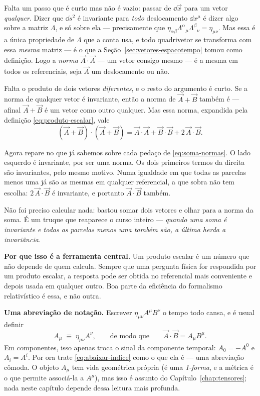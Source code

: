 \documentclass[12pt,a4paper,oneside]{book}
\theoremstyle{rgplain}
\theoremstyle{rgremark}
\begin{document}
Falta um passo que é curto mas não é vazio: passar de $\dd\vec x$ para um vetor
\emph{qualquer}. Dizer que $\dd s^2$ é invariante para \emph{todo} deslocamento
$\dd x^\mu$ é dizer algo sobre a matriz $\Lambda$, e só sobre ela ---
precisamente que $\eta_{\alpha\beta}\Lambda^\alpha{}_\mu\Lambda^\beta{}_\nu
=\eta_{\mu\nu}$. Mas essa é a única propriedade de $\Lambda$ que a conta usa, e
todo quadrivetor se transforma com essa \emph{mesma} matriz --- é o que a
Seção~\ref{sec:vetores-espacotempo} tomou como definição. Logo a \emph{norma}
$\vec A\cdot\vec A$ --- um vetor consigo mesmo --- é a mesma em todos os
referenciais, seja $\vec A$ um deslocamento ou não.

Falta o produto de dois vetores \emph{diferentes}, e o resto do argumento é
curto. Se a norma de qualquer vetor é invariante, então a norma de
$\vec A+\vec B$ também é --- afinal $\vec A+\vec B$ é um vetor como outro
qualquer. Mas essa norma, expandida pela definição \eqref{eq:produto-escalar},
vale
\begin{equation}
  (\vec A+\vec B)\cdot(\vec A+\vec B)
   =\vec A\cdot\vec A+\vec B\cdot\vec B+2\,\vec A\cdot\vec B .
  \label{eq:soma-normas}
\end{equation}

Agora repare no que já sabemos sobre cada pedaço de \eqref{eq:soma-normas}. O
lado esquerdo é invariante, por ser uma norma. Os dois primeiros termos da
direita são invariantes, pelo mesmo motivo. Numa igualdade em que todas as
parcelas menos uma já são as mesmas em qualquer referencial, a que sobra não
tem escolha: $2\,\vec A\cdot\vec B$ é invariante, e portanto
$\vec A\cdot\vec B$ também.

\begin{roteiro}[title={\sffamily\bfseries\footnotesize\color{rgGrafite}A MANOBRA, EM UMA FRASE}]
Não foi preciso calcular nada: bastou somar dois vetores e olhar para a norma
da soma. É um truque que reaparece o curso inteiro
--- \emph{quando uma soma é invariante e todas as parcelas menos uma também
são, a última herda a invariância}.
\end{roteiro}

\textbf{Por que isso é a ferramenta central.} Um produto escalar é um número
que não depende de quem calcula. Sempre que uma pergunta física for
respondida por um produto escalar, a resposta pode ser obtida no referencial
mais conveniente e depois usada em qualquer outro. Boa parte da eficiência do
formalismo relativístico é essa, e não outra.

\textbf{Uma abreviação de notação.} Escrever $\eta_{\mu\nu}A^\mu B^\nu$ o
tempo todo cansa, e é usual definir
\begin{equation}
  A_\mu\;\equiv\;\eta_{\mu\nu}A^\nu ,
  \qquad\text{de modo que}\qquad
  \vec A\cdot\vec B=A_\mu B^\mu .
  \label{eq:abaixar-indice}
\end{equation}
Em componentes, isso apenas troca o sinal da componente temporal:
$A_0=-A^0$ e $A_i=A^i$. Por ora trate \eqref{eq:abaixar-indice} como o que
ela é --- uma abreviação cômoda. O objeto $A_\mu$ tem vida geométrica
própria (é uma \emph{1-forma}, e a métrica é o que permite associá-la a
$A^\mu$), mas isso é assunto do Capítulo~\ref{chap:tensores}; nada neste
capítulo depende dessa leitura mais profunda.
\end{document}

